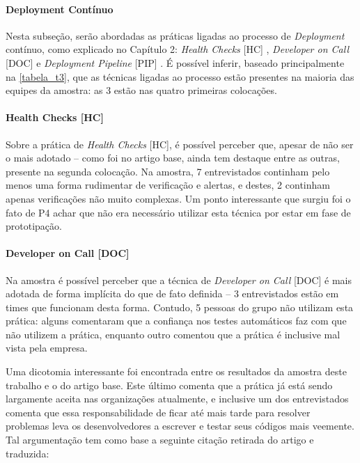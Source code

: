\paragraph{Deployment Contínuo}

Nesta subseção, serão abordadas as práticas ligadas ao processo de \emph{Deployment} contínuo, como explicado no Capítulo 2: \emph{Health Checks} [HC] \cite{devopsBook}, \emph{Developer on Call} [DOC] \cite{devAndDeploymentFB} e \emph{Deployment Pipeline} [PIP] \cite{devopsBook}. É possível inferir, baseado principalmente na \ref{tabela_t3}, que as técnicas ligadas ao processo estão presentes na maioria das equipes da amostra: as 3 estão nas quatro primeiras colocações. 

\paragraph{Health Checks [HC]}

Sobre a prática de \emph{Health Checks} [HC], é possível perceber que, apesar de não ser o mais adotado -- como foi no artigo base, ainda tem destaque entre as outras, presente na segunda colocação. Na amostra, 7 entrevistados continham pelo menos uma forma rudimentar de verificação e alertas, e destes, 2 continham apenas verificações não muito complexas. Um ponto interessante que surgiu foi o fato de P4 achar que não era necessário utilizar esta técnica por estar em fase de prototipação.

\paragraph{Developer on Call [DOC]}

Na amostra é possível perceber que a técnica de \emph{Developer on Call} [DOC] é mais adotada de forma implícita do que de fato definida -- 3 entrevistados estão em times que funcionam desta forma. Contudo, 5 pessoas do grupo não utilizam esta prática: alguns comentaram que a confiança nos testes automáticos faz com que não utilizem a prática, enquanto outro comentou que a prática é inclusive mal vista pela empresa.

Uma dicotomia interessante foi encontrada entre os resultados da amostra deste trabalho e o do artigo base. Este último comenta que a prática já está sendo largamente aceita nas organizações atualmente, e inclusive um dos entrevistados comenta que essa responsabilidade de ficar até mais tarde para resolver problemas leva os desenvolvedores a escrever e testar seus códigos mais veemente. Tal argumentação tem como base a seguinte citação retirada do artigo e traduzida:

